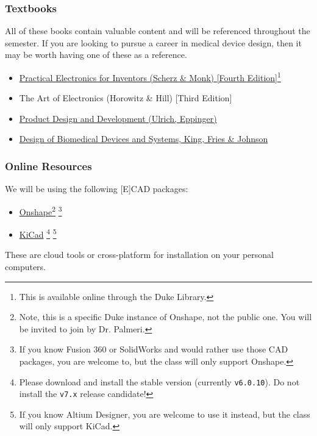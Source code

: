 \documentclass[10pt]{report}
\begin{document}
\subsubsection*{Textbooks}
All of these books contain valuable content and will be referenced throughout
the semester.  If you are looking to pursue a career in medical device design,
then it may be worth having one of these as a reference.

\begin{itemize}
    \item \href{https://find.library.duke.edu/catalog/DUKE009381868}{Practical Electronics for Inventors (Scherz \& Monk) [Fourth Edition]}\footnote{This is available online through the Duke Library.}
    \item The Art of Electronics (Horowitz \& Hill) [Third Edition]
    \item \href{http://www.ulrich-eppinger.net/}{Product Design and Development (Ulrich, Eppinger)}
    \item \href{https://www.crcpress.com/Design-of-Biomedical-Devices-and-Systems/King-Fries-Johnson/p/book/9781466569133}{Design of Biomedical Devices and Systems, King, Fries \& Johnson}
\end{itemize}

\subsubsection*{Online Resources}
We will be using the following [E]CAD packages:
\begin{itemize}
    \item \href{https://duke.onshape.com}{Onshape}\footnote{Note, this is a
    specific Duke instance of Onshape, not the public one.  You will be invited
    to join by Dr. Palmeri.}
    \footnote{If you know Fusion 360 or SolidWorks and would rather use those CAD
    packages, you are welcome to, but the class will only support Onshape.}
    \item \href{https://kicad.org/}{KiCad}
    \footnote{Please download and install the stable version (currently \texttt{v6.0.10}). Do not install the
    \texttt{v7.x} release candidate!}
    \footnote{If you know Altium Designer, you are welcome to use it instead, but
    the class will only support KiCad.}
\end{itemize}

These are cloud tools or cross-platform for installation on your personal computers.
\end{document}
